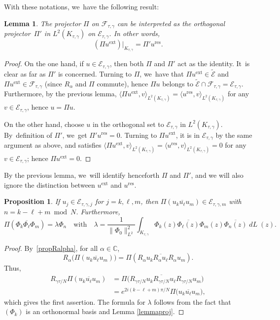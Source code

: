 \documentclass[JEP,XML,SOM,Unicode,NoFloatCountersInSection,published]{cedram}
\newcommand{\ext}{\mathrm{ext}}
\newcommand{\res}{\mathrm{res}}
\DeclareMathOperator{\dL}{\mathit{dL}}
\newtheorem{lemme}[theorem]{Lemma}
\newtheorem{prop}[theorem]{Proposition}
\theoremstyle{definition}
\let\ov\overline
\newcommand\C{\mathbb C}
\begin{document}
With these notations, we~have the following result:

\begin{lemme} \label{lemmaproj2}
The projector $\Pi$ on $\mathcal{F}_{\tau,\gamma}$ can be interpreted as the orthogonal projector~$\Pi'$ in $L^2(K_{\tau,\gamma})$ on $\mathcal{E}_{\tau,\gamma}$. In other words,
\[
(\Pi u^{\ext})\big|_{K_{\tau,\gamma}} = \Pi' u^{\res}.
\]
\end{lemme}

\begin{proof} On the one hand, if $u \in \mathcal{E}_{\tau,\gamma}$, then both $\Pi$ and $\Pi'$ act as the identity. It~is clear as far as $\Pi'$ is concerned. Turning to $\Pi$, we~have that $\Pi u^{\ext} \in \widetilde{\mathcal{E}}$ and $\Pi u^{\ext} \in \mathcal{F}_{\tau,\gamma}$ (since $R_\alpha$ and $\Pi$ commute), hence $\Pi u$ belongs to $\widetilde{\mathcal{E}} \cap \mathcal{F}_{\tau,\gamma} = \mathcal{E}_{\tau,\gamma}$. Furthermore, by the previous lemma, $\langle \Pi u^{\ext}, v \rangle_{L^2(K_{\tau,\gamma})} = \langle u^{\res}, v \rangle_{L^2(K_{\tau,\gamma})}$ for any $v \in \mathcal{E}_{\tau,\gamma}$, hence $u = \Pi u$.

On the other hand, choose $u$ in the orthogonal set to $\mathcal{E}_{\tau,\gamma}$ in $L^2(K_{\tau,\gamma})$. By~definition of $\Pi'$, we~get $\Pi' u^{\res} = 0$. Turning to $\Pi u^{\ext}$, it is in $\mathcal{E}_{\tau,\gamma}$ by the same argument as above, and satisfies $\langle \Pi u^{\ext}, v \rangle_{L^2(K_{\tau,\gamma})} = \langle u^{\res}, v \rangle_{L^2(K_{\tau,\gamma})}=0$ for any $v \in \mathcal{E}_{\tau,\gamma}$; hence $\Pi u^{\ext} = 0$.
\end{proof}

By the previous lemma, we~will identify henceforth $\Pi$ and $\Pi'$, and we will also ignore the distinction between $u^{\ext}$ and $u^{\res}$.

\begin{prop}
If $u_j \in \mathcal{E}_{\tau,\gamma,j}$ for $j=k, \ell, m$, then $\Pi(u_k \ov{u_{\ell}} {u_m})\in \mathcal{E}_{\tau,\gamma,m} $ with $n=k-\ell+m\bmod N$.
Furthermore,
\[
\Pi (\Phi_{k} \ov{\Phi_{\ell}} \Phi_{m}) = \lambda \Phi_{n} \quad \text{with} \quad \lambda = \frac{1}{\| \Phi_0 \|_{L^2}^2} \int_{K_{\tau, \gamma}} \Phi_{k}(z) \ov{\Phi_{\ell}(z)} \Phi_{m}(z)\ov{\Phi_{n}(z)} \dL(z).
\]
\end{prop}

\begin{proof} By~\eqref{propRalpha}, for all $\alpha \in \C$,
\[
R_\alpha\bigl(\Pi(u_k \ov{u_\ell} {u_m})\bigr) =\Pi(R_\alpha u_k \ov{R_\alpha u_\ell} {R_\alpha u_m}).
\]
Thus,
\begin{align*}
R_{{\gamma \tau}/{N}} \Pi(u_k \ov{u_\ell} {u_m})&= \Pi\bigl(R_{{\gamma \tau}/{N}} u_k \ov{ R_{{\gamma \tau}/{N}}} u_\ell {R_{{\gamma \tau}/{N}} u_m}\bigr)\\
&= e^{{2i(k-\ell+m)\pi}/N}\Pi\bigl(u_k \ov{u_\ell} {u_m}\bigr),
\end{align*}
which gives the first assertion. The formula for $\lambda$ follows from the fact that $(\Phi_k)$ is an orthonormal basis and Lemma \ref{lemmaproj}.
\end{proof}
\end{document}
